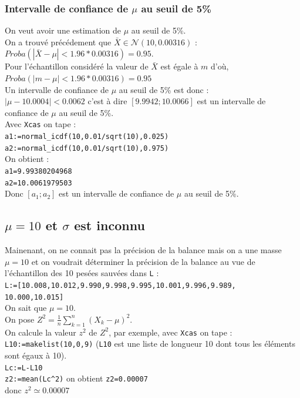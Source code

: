 \documentclass[a4paper,11pt]{book}
\begin{document}
\subsubsection{Intervalle de confiance de $\mu$ au  seuil de 5\%}
On veut avoir une estimation de $\mu$ au  seuil de 5\%.\\
On a trouv\'e pr\'ec\'edement que $\bar X \in \mathcal N(10,0.00316)$ :\\
$Proba(|\bar X-\mu|<1.96*0.00316)=0.95$.\\
Pour l'\'echantillon consid\'er\'e la valeur de 
$\bar X$ est \'egale \`a $m$ d'o\`u,\\
$Proba(|m-\mu|<1.96*0.00316)=0.95$\\
Un intervalle de confiance de $\mu$ au  seuil de 5\% est donc :\\
$|\mu-10.0004|<0.0062$  c'est \`a dire $[9.9942;10.0066]$ est un intervalle de confiance de $\mu$ au  seuil de 5\%.\\
Avec {\tt Xcas} on tape :\\
{\tt a1:=normal\_icdf(10,0.01/sqrt(10),0.025)}\\
{\tt a2:=normal\_icdf(10,0.01/sqrt(10),0.975)}\\
On obtient :\\
{\tt a1=9.99380204968}\\
{\tt a2=10.0061979503}\\
Donc  $[a_1;a_2]$ est un intervalle de confiance de $\mu$ au  seuil de 5\%.
\subsection{$\mu=10$ et $\sigma$ est inconnu} \label{sec:sigmainc}
Mainenant, on ne connait pas la pr\'ecision de la balance mais on a 
 une masse $\mu=10$ et on voudrait d\'eterminer la pr\'ecision de la balance 
au vue de l'\'echantillon des 10 pes\'ees sauv\'ees dans {\tt L} :\\
{\tt L:=[10.008,10.012,9.990,9.998,9.995,10.001,9.996,9.989,\\10.000,10.015]}\\
On sait que $\mu=10$.\\
On pose $Z^2=\frac{1}{n}\sum_{k=1}^n(X_k-\mu)^2$.\\
On calcule la valeur $z^2$ de $Z^2$, par exemple,
avec {\tt Xcas} on tape :\\
{\tt L10:=makelist(10,0,9)} ({\tt L10} est une liste de longueur 10 dont tous
les \'el\'ements sont \'egaux \`a 10).\\
{\tt Lc:=L-L10}\\
{\tt z2:=mean(Lc\verb|^|2)}
on obtient {\tt z2=0.00007}\\
donc $z^2\simeq 0.00007$
\end{document}
